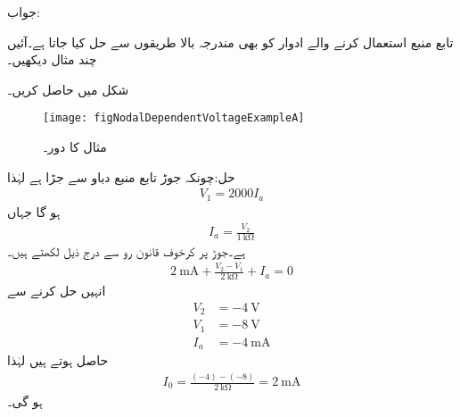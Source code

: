 جواب:

تابع  منبع استعمال کرنے والے ادوار کو بھی مندرجہ بالا طریقوں سے حل کیا جاتا ہے۔آئیں چند مثال دیکھیں۔


شکل  میں  حاصل کریں۔
\begin{figure}
\centering
\texttt{[image: figNodalDependentVoltageExampleA]}
\caption{مثال  کا دور۔}
\label{شکل_جوڑ_مثال_تابع_منبع_دباو_الف}
\end{figure}

حل:چونکہ جوڑ  تابع منبع دباو سے جڑا ہے لہٰذا
\begin{align*}
V_1=2000 I_a
\end{align*}
ہو گا جہاں
\begin{align*}
I_a=\frac{V_2}{\SI{1}{\kilo\ohm}}
\end{align*}
ہے۔جوڑ  پر کرخوف قانون رو سے درج ذیل لکھتے ہیں۔
\begin{align*}
\SI{2}{\milli\ampere}+\frac{V_2-V_1}{\SI{2}{\kilo\ohm}}+I_a=0
\end{align*}
انہیں حل کرنے سے
\begin{align*}
V_2&=\SI{-4}{\volt}\\
V_1&=\SI{-8}{\volt}\\
I_a&=\SI{-4}{\milli\ampere}
\end{align*}
حاصل ہوتے ہیں لہٰذا
\begin{align*}
I_0=\frac{(-4)-(-8)}{\SI{2}{\kilo\ohm}}=\SI{2}{\milli\ampere}
\end{align*}
ہو گی۔

